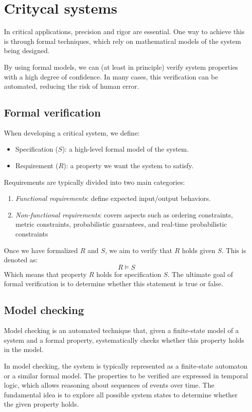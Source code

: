 \section{Critycal systems}

In critical applications, precision and rigor are essential. 
One way to achieve this is through formal techniques, which rely on mathematical models of the system being designed.

By using formal models, we can (at least in principle) verify system properties with a high degree of confidence. 
In many cases, this verification can be automated, reducing the risk of human error.

\subsection{Formal verification}
When developing a critical system, we define:
\begin{itemize}
    \item Specification ($S$): a high-level formal model of the system.
    \item Requirement ($R$): a property we want the system to satisfy.
\end{itemize}
\noindent Requirements are typically divided into two main categories:
\begin{enumerate}
    \item \textit{Functional requirements}: define expected input/output behaviors.
    \item \textit{Non-functional requirements}: covers aspects such as ordering constraints, metric constraints, probabilistic guarantees, and real-time probabilistic constraints
\end{enumerate}
\noindent Once we have formalized $R$ and $S$, we aim to verify that $R$ holds given $S$. 
This is denoted as: 
\[R\models S\]
Which means that property $R$ holds for specification $S$. 
The ultimate goal of formal verification is to determine whether this statement is true or false.

\subsection{Model checking}
\begin{definition}
    Model checking is an automated technique that, given a finite-state model of a system and a formal property, systematically checks whether this property holds in the model.
\end{definition}
In model checking, the system is typically represented as a finite-state automaton or a similar formal model. 
The properties to be verified are expressed in temporal logic, which allows reasoning about sequences of events over time. 
The fundamental idea is to explore all possible system states to determine whether the given property holds.

